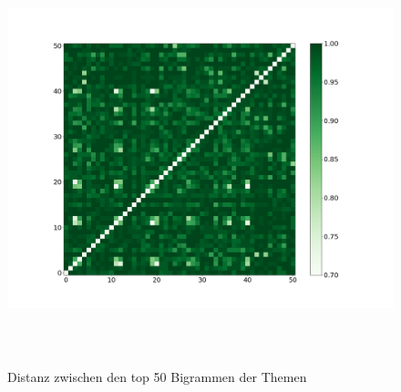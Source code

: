 \begin{figure}[htpb]
	\centering
	\includegraphics[width=\textwidth,height=12cm,keepaspectratio=true]{img/bigram_jaccard_50_green_07.png}
	\caption{
		Distanz zwischen den top 50 Bigrammen der Themen
	}
	\label{fig:Distanz_Bigramme}
\end{figure}